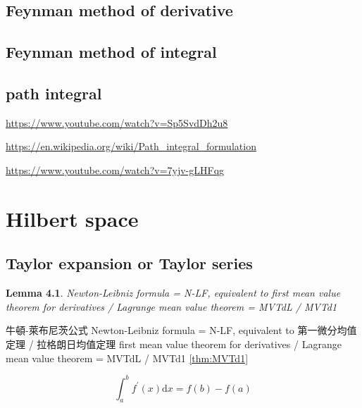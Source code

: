 \documentclass[
]{book}
\newtheorem{lemma}{Lemma}[chapter]
\theoremstyle{definition}
\theoremstyle{definition}
\theoremstyle{definition}
\theoremstyle{definition}
\theoremstyle{remark}
\begin{document}
\section{Feynman method of derivative}\label{feynman-method-of-derivative}

\section{Feynman method of integral}\label{feynman-method-of-integral}

\section{path integral}\label{path-integral}

\url{https://www.youtube.com/watch?v=Sp5SvdDh2u8}

\url{https://en.wikipedia.org/wiki/Path_integral_formulation}

\url{https://www.youtube.com/watch?v=7yjv-gLHFqg}

\chapter{Hilbert space}\label{hilbert-space}

\section{Taylor expansion or Taylor series}\label{taylor-expansion-or-taylor-series}

\begin{lemma}
\protect\hypertarget{lem:unnamed-chunk-1}{}\label{lem:unnamed-chunk-1}Newton-Leibniz formula = N-LF, equivalent to first mean value theorem for derivatives / Lagrange mean value theorem = MVTdL / MVTd1
\end{lemma}

\begin{CJK}{UTF8}{bsmi}
牛頓-萊布尼茨公式 Newton-Leibniz formula = N-LF, equivalent to 第一微分均值定理 / 拉格朗日均值定理 first mean value theorem for derivatives / Lagrange mean
value theorem = MVTdL / MVTd1 \ref{thm:MVTd1} \label{thm:N-LF}
\end{CJK}

\begin{equation}
\int_{a}^{b}f^{\prime}\left(x\right)\mathrm{d}x=f\left(b\right)-f\left(a\right)\label{eq:N-LF}
\end{equation}
\end{document}

